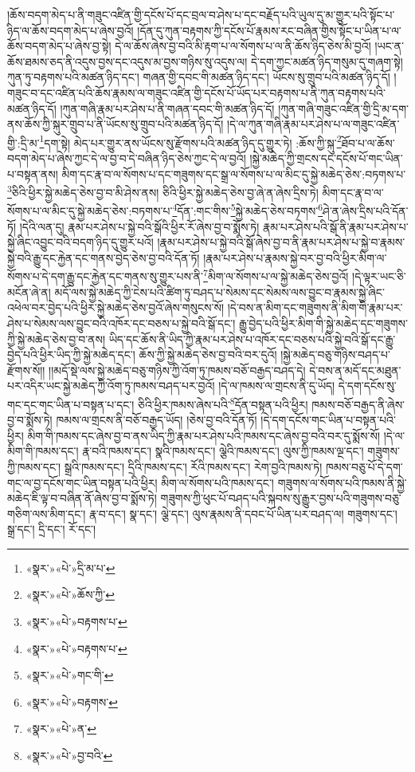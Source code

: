 །ཆོས་བདག་མེད་པ་ནི་གཟུང་འཛིན་གྱི་དངོས་པོ་དང་བྲལ་བ་ཤེས་པ་དང་བརྗོད་པའི་ཡུལ་དུ་མ་གྱུར་པའི་སྟོང་པ་ཉིད་ལ་ཆོས་བདག་མེད་པ་ཞེས་བྱའོ། །དོན་དུ་ཀུན་བརྟགས་ཀྱི་དངོས་པོ་རྣམས་རང་བཞིན་གྱིས་སྟོང་པ་ཡིན་པ་ལ་ཆོས་བདག་མེད་པ་ཞེས་བྱ་སྟེ། དེ་ལ་ཆོས་ཞེས་བྱ་བའི་མི་རྟག་པ་ལ་སོགས་པ་ལ་ནི་ཆོས་ཉིད་ཅེས་མི་བྱའོ། །ཡང་ན་ཆོས་ཐམས་ཅད་ནི་འདུས་བྱས་དང་འདུས་མ་བྱས་གཉིས་སུ་འདུས་ལ། དེ་དག་ཀྱང་མཚན་ཉིད་གསུམ་དུ་གཞག་སྟེ། ཀུན་ཏུ་བརྟགས་པའི་མཚན་ཉིད་དང་། གཞན་གྱི་དབང་གི་མཚན་ཉིད་དང་། ཡོངས་སུ་གྲུབ་པའི་མཚན་ཉིད་དོ། །གཟུང་བ་དང་འཛིན་པའི་ཆོས་རྣམས་ལ་གཟུང་འཛིན་གྱི་དངོས་པོ་ཡོད་པར་བརྟགས་པ་ནི་ཀུན་བརྟགས་པའི་མཚན་ཉིད་དོ། །ཀུན་གཞི་རྣམ་པར་ཤེས་པ་ནི་གཞན་དབང་གི་མཚན་ཉིད་དོ། །ཀུན་གཞི་གཟུང་འཛིན་གྱི་དྲི་མ་དག་ནས་ཆོས་ཀྱི་སྐུར་གྲུབ་པ་ནི་ཡོངས་སུ་གྲུབ་པའི་མཚན་ཉིད་དོ། །དེ་ལ་ཀུན་གཞི་རྣམ་པར་ཤེས་པ་ལ་གཟུང་འཛིན་གྱི་:དྲི་མ་\footnote{«སྣར་»«པེ་»དྲི་མ་པ་}དག་སྟེ། མེད་པར་གྱུར་ནས་ཡོངས་སུ་རྫོགས་པའི་མཚན་ཉིད་དུ་གྱུར་ཏེ། :ཆོས་ཀྱི་སྐུ་\footnote{«སྣར་»«པེ་»ཆོས་ཀྱི་}ཐོབ་པ་ལ་ཆོས་བདག་མེད་པ་ཞེས་ཀྱང་དེ་ལ་བྱ་བ་དེ་བཞིན་ཉིད་ཅེས་ཀྱང་དེ་ལ་བྱའོ། །སྐྱེ་མཆེད་ཀྱི་གྲངས་དང་དངོས་པོ་གང་ཡིན་པ་བསྟན་ནས། མིག་དང་རྣ་བ་ལ་སོགས་པ་དང་གཟུགས་དང་སྒྲ་ལ་སོགས་པ་ལ་མིང་དུ་སྐྱེ་མཆེད་ཅེས་:བཏགས་པ་\footnote{«སྣར་»«པེ་»བརྟགས་པ་}ཅིའི་ཕྱིར་སྐྱེ་མཆེད་ཅེས་བྱ་བ་མི་ཤེས་ནས། ཅིའི་ཕྱིར་སྐྱེ་མཆེད་ཅེས་བྱ་ཞེ་ན་ཞེས་དྲིས་ཏེ། མིག་དང་རྣ་བ་ལ་སོགས་པ་ལ་མིང་དུ་སྐྱེ་མཆེད་ཅེས་:བཏགས་པ་\footnote{«སྣར་»«པེ་»བརྟགས་པ་}དོན་:གང་གིས་\footnote{«སྣར་»«པེ་»གང་གི་}སྐྱེ་མཆེད་ཅེས་བཏགས་\footnote{«སྣར་»«པེ་»བརྟགས་}ཤེ་ན་ཞེས་དྲིས་པའི་དོན་ཏོ། །དེའི་ལན་དུ། རྣམ་པར་ཤེས་པ་སྐྱེ་བའི་སྒོའི་ཕྱིར་རོ་ཞེས་བྱ་བ་སྨོས་ཏེ། རྣམ་པར་ཤེས་པའི་སྒོ་ནི་རྣམ་པར་ཤེས་པ་སྐྱེ་ཞིང་འབྱུང་བའི་བདག་ཉིད་དུ་གྱུར་པའོ། །རྣམ་པར་ཤེས་པ་སྐྱེ་བའི་སྒོ་ཞེས་བྱ་བ་ནི་རྣམ་པར་ཤེས་པ་སྐྱེ་བ་རྣམས་སྐྱེ་བའི་རྒྱུ་དང་རྐྱེན་དང་གནས་བྱེད་ཅེས་བྱ་བའི་དོན་ཏོ། །རྣམ་པར་ཤེས་པ་རྣམས་སྐྱེ་བར་བྱ་བའི་ཕྱིར་མིག་ལ་སོགས་པ་དེ་དག་རྒྱུ་དང་རྐྱེན་དང་གནས་སུ་གྱུར་པས་ནི་\footnote{«སྣར་»«པེ་»ན་}མིག་ལ་སོགས་པ་ལ་སྐྱེ་མཆེད་ཅེས་བྱའོ། །དེ་ལྟར་ཡང་ཅི་མངོན་ཞེ་ན། མདོ་ལས་སྐྱེ་མཆེད་ཀྱི་ངེས་པའི་ཚིག་ཏུ་བཤད་པ་སེམས་དང་སེམས་ལས་བྱུང་བ་རྣམས་སྐྱེ་ཞིང་འཕེལ་བར་བྱེད་པའི་ཕྱིར་སྐྱེ་མཆེད་ཅེས་བྱའོ་ཞེས་གསུངས་སོ། །དེ་བས་ན་མིག་དང་གཟུགས་ནི་མིག་གི་རྣམ་པར་ཤེས་པ་སེམས་ལས་བྱུང་བའི་འཁོར་དང་བཅས་པ་སྐྱེ་བའི་སྒོ་དང་། རྒྱུ་བྱེད་པའི་ཕྱིར་མིག་གི་སྐྱེ་མཆེད་དང་གཟུགས་ཀྱི་སྐྱེ་མཆེད་ཅེས་བྱ་བ་ནས། ཡིད་དང་ཆོས་ནི་ཡིད་ཀྱི་རྣམ་པར་ཤེས་པ་འཁོར་དང་བཅས་པའི་སྐྱེ་བའི་སྒོ་དང་རྒྱུ་བྱེད་པའི་ཕྱིར་ཡིད་ཀྱི་སྐྱེ་མཆེད་དང་། ཆོས་ཀྱི་སྐྱེ་མཆེད་ཅེས་བྱ་བའི་བར་དུའོ། །སྐྱེ་མཆེད་བཅུ་གཉིས་བཤད་པ་རྫོགས་སོ།། །།མདོ་སྡེ་ལས་སྐྱེ་མཆེད་བཅུ་གཉིས་ཀྱི་འོག་ཏུ་ཁམས་བཅོ་བརྒྱད་བཤད་དེ། དེ་བས་ན་མདོ་དང་མཐུན་པར་འདིར་ཡང་སྐྱེ་མཆེད་ཀྱི་འོག་ཏུ་ཁམས་བཤད་པར་བྱའོ། །དེ་ལ་ཁམས་ལ་གྲངས་ནི་དུ་ཡོད། དེ་དག་དངོས་སུ་གང་དང་གང་ཡིན་པ་བསྟན་པ་དང་། ཅིའི་ཕྱིར་ཁམས་ཞེས་པའི་\footnote{«སྣར་»«པེ་»བྱ་བའི་}དོན་བསྟན་པའི་ཕྱིར། ཁམས་བཅོ་བརྒྱད་ནི་ཞེས་བྱ་བ་སྨོས་ཏེ། ཁམས་ལ་གྲངས་ནི་བཅོ་བརྒྱད་ཡོད། །ཅེས་བྱ་བའི་དོན་ཏོ། །དེ་དག་དངོས་གང་ཡིན་པ་བསྟན་པའི་ཕྱིར། མིག་གི་ཁམས་དང་ཞེས་བྱ་བ་ནས་ཡིད་ཀྱི་རྣམ་པར་ཤེས་པའི་ཁམས་དང་ཞེས་བྱ་བའི་བར་དུ་སྨོས་སོ། །དེ་ལ་མིག་གི་ཁམས་དང་། རྣ་བའི་ཁམས་དང་། སྣའི་ཁམས་དང་། ལྕེའི་ཁམས་དང་། ལུས་ཀྱི་ཁམས་ལྔ་དང་། གཟུགས་ཀྱི་ཁམས་དང་། སྒྲའི་ཁམས་དང་། དྲིའི་ཁམས་དང་། རོའི་ཁམས་དང་། རེག་བྱའི་ཁམས་ཏེ། ཁམས་བཅུ་པོ་དེ་དག་གང་ལ་བྱ་དངོས་གང་ཡིན་བསྟན་པའི་ཕྱིར། མིག་ལ་སོགས་པའི་ཁམས་དང་། གཟུགས་ལ་སོགས་པའི་ཁམས་ནི་སྐྱེ་མཆེད་ཇི་ལྟ་བ་བཞིན་ནོ་ཞེས་བྱ་བ་སྨོས་ཏེ། གཟུགས་ཀྱི་ཕུང་པོ་བཤད་པའི་སྐབས་སུ་རྒྱུར་བྱས་པའི་གཟུགས་བཅུ་གཅིག་ལས་མིག་དང་། རྣ་བ་དང་། སྣ་དང་། ལྕེ་དང་། ལུས་རྣམས་ནི་དབང་པོ་ཡིན་པར་བཤད་ལ། གཟུགས་དང་། སྒྲ་དང་། དྲི་དང་། རོ་དང་། 